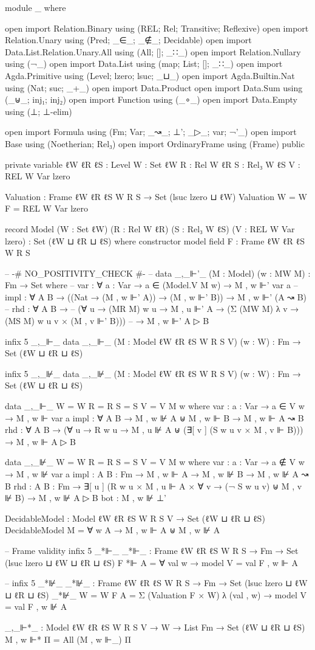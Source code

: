 \begin{spverbatim}
module _ where

open import Relation.Binary using (REL; Rel; Transitive; Reflexive)
open import Relation.Unary using (Pred; _∈_; _∉_; Decidable)
open import Data.List.Relation.Unary.All using (All; []; _∷_)
open import Relation.Nullary using (¬_)
open import Data.List using (map; List; []; _∷_)
open import Agda.Primitive using (Level; lzero; lsuc; _⊔_)
open import Agda.Builtin.Nat using (Nat; suc; _+_)
open import Data.Product
open import Data.Sum using (_⊎_; inj₁; inj₂)
open import Function using (_∘_)
open import Data.Empty using (⊥; ⊥-elim)

open import Formula using (Fm; Var; _↝_; ⊥'; _▷_; var; ¬'_)
open import Base using (Noetherian; Rel₃)
open import OrdinaryFrame using (Frame) public

private
  variable
    ℓW ℓR ℓS : Level
    W : Set ℓW
    R : Rel W ℓR
    S : Rel₃ W ℓS
    V : REL W Var lzero

Valuation : Frame {ℓW} {ℓR} {ℓS} W R S → Set (lsuc lzero ⊔ ℓW)
Valuation {W = W} F = REL W Var lzero

record Model (W : Set ℓW) (R : Rel W ℓR) (S : Rel₃ W ℓS) (V : REL W Var lzero)
  : Set (ℓW ⊔ ℓR ⊔ ℓS) where
  constructor model
  field
    F : Frame {ℓW} {ℓR} {ℓS} W R S

-- {-# NO_POSITIVITY_CHECK #-}
-- data _,_⊩'_ (M : Model) (w : MW M) : Fm → Set where
--   var : ∀ {a : Var} → a ∈ (Model.V M w) → M , w ⊩' var a
-- impl : ∀ {A B} → ((Nat → (M , w ⊩' A)) → (M , w ⊩' B)) → M , w ⊩' (A ↝ B)
--   rhd : ∀ {A B} →
--     (∀ {u} → (MR M) w u → M , u ⊩' A → (Σ (MW M) λ v → (MS M) w u v × (M , v ⊩' B)))
--     → M , w ⊩' A ▷ B

infix 5 _,_⊩_
data _,_⊩_ (M : Model {ℓW} {ℓR} {ℓS} W R S V) (w : W)
  : Fm → Set (ℓW ⊔ ℓR ⊔ ℓS)

infix 5 _,_⊮_
data _,_⊮_ (M : Model {ℓW} {ℓR} {ℓS} W R S V) (w : W)
  : Fm → Set (ℓW ⊔ ℓR ⊔ ℓS)

data _,_⊩_ {W = W} {R = R} {S = S} {V = V} M w where
  var : {a : Var} → a ∈ V w → M , w ⊩ var a
  impl : ∀ {A B} → M , w ⊮ A ⊎ M , w ⊩ B → M , w ⊩ A ↝ B
  rhd : ∀ {A B} →
    (∀ {u} → R w u → M , u ⊮ A ⊎ (∃[ v ] (S w u v × M , v ⊩ B)))
    → M , w ⊩ A ▷ B

data _,_⊮_ {W = W} {R = R} {S = S} {V = V} M w where
  var : {a : Var} → a ∉ V w → M , w ⊮ var a
  impl : {A B : Fm} → M , w ⊩ A → M , w ⊮ B → M , w ⊮ A ↝ B
  rhd : {A B : Fm} →
    ∃[ u ] (R w u × M , u ⊩ A × ∀ v → (¬ S w u v) ⊎ M , v ⊮ B)
    → M , w ⊮ A ▷ B
  bot : M , w ⊮ ⊥'

DecidableModel : Model {ℓW} {ℓR} {ℓS} W R S V → Set (ℓW ⊔ ℓR ⊔ ℓS)
DecidableModel M = ∀ w A → M , w ⊩ A ⊎ M , w ⊮ A

-- Frame validity
infix 5 _*⊩_
_*⊩_ : Frame {ℓW} {ℓR} {ℓS} W R S → Fm → Set (lsuc lzero ⊔ ℓW ⊔ ℓR ⊔ ℓS)
F *⊩ A = ∀ val w → model {V = val} F , w ⊩ A

-- infix 5 _*⊮_
_*⊮_ : Frame {ℓW} {ℓR} {ℓS} W R S → Fm → Set (lsuc lzero ⊔ ℓW ⊔ ℓR ⊔ ℓS)
_*⊮_ {W = W} F A = Σ (Valuation F × W) λ { (val , w) → model {V = val} F , w ⊮ A}


_,_⊩*_ : Model {ℓW} {ℓR} {ℓS} W R S V → W → List Fm → Set (ℓW ⊔ ℓR ⊔ ℓS)
M , w ⊩* Π = All (M , w ⊩_) Π
\end{spverbatim}
